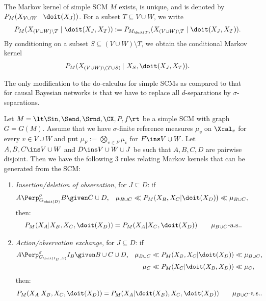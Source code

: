The Markov kernel of simple SCM $M$ exists, is unique, and is denoted by $P_{M}(X_{V\cup W} \mid \doit(X_J))$.
For a subset $T \subseteq V \cup W$, we write 
$$P_{M}(X_{(V\cup W)\setminus T} \mid \doit(X_J,X_T)) := P_{M_{\doit(T)}}(X_{(V\cup W)\setminus T} \mid \doit(X_J,X_T)).$$
By conditioning on a subset $S \subseteq (V \cup W) \setminus T$, we obtain the conditional Markov kernel
$$P_{M}(X_{(V\cup W)\setminus (T \cup S)} \mid X_S, \doit(X_J,X_T)).$$

The only modification to the do-calculus for simple SCMs as compared to that for causal Bayesian networks is that
we have to replace all $d$-separations by $\sigma$-separations.
\begin{Thm}\label{thm:as-do-calculus-scms-simplified}
  Let $M = \lt \Sin, \Send, \Srnd, \CX, P, f \rt$ be a simple SCM with graph $G = G(M)$.
  Assume that we have $\sigma$-finite reference measures $\mu_v$ on $\Xcal_v$ for every $v \in V \cup W$
  and put $\mu_F := \bigotimes_{v \in F} \mu_v$ for $F \ins V \cup W$.
  Let $A,B,C \ins V \cup W$ and $D \ins V \cup W \cup J$ be such that $A,B,C,D$ are pairwise disjoint.
  Then we have the following 3 rules relating Markov kernels that can be generated from the SCM:
  \begin{enumerate}
      \item \emph{Insertion/deletion of observation}, for $J \subseteq D$: if
       \begin{align*} 
           A &\Perp^\sigma_{G_{\doit(D)}} B \given C \cup D, &
           \mu_{B \cup C} &\ll P_M(X_B,X_C|\doit(X_{D}))\ll \mu_{B \cup C},
       \end{align*}
        then:
          \[ P_M(X_A|X_B,X_C,\doit(X_{D})) = P_M(X_A|X_C,\doit(X_{D})) \qquad \mu_{B \cup C}\text{-a.s.}.\]
     \item \emph{Action/observation exchange}, for $J \subseteq D$: if
       \begin{align*} 
           A & \Perp^\sigma_{G_{\doit(I_B,D)}} I_B \given B \cup C \cup D, &          
                  \mu_{B \cup C} &\ll  P_M(X_B,X_C|\doit(X_{D})) \ll \mu_{B \cup C},\\
               &&   \mu_C &\ll  P_M(X_C|\doit(X_B,X_{D})) \ll \mu_C,
       \end{align*}
        then:
       \[ P_M(X_A|X_B,X_C,\doit(X_{D}))  = P_M(X_A|\doit(X_B),X_C,\doit(X_{D})) \qquad \mu_{B \cup C}\text{-a.s.}.\]

\end{enumerate}
\end{Thm}

